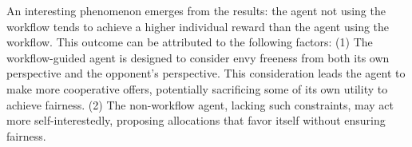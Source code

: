 \begin{table}[!ht]
    \centering
    \caption{Workflow-LLM vs. Raw-LLM}
    \label{tab:workflow-raw}
\end{table}

\begin{table}[!ht]
    \centering
    \caption{Raw-LLM vs. Workflow-LLM}
    \label{tab:raw-workflow}
\end{table}

An interesting phenomenon emerges from the results: the agent not using the workflow tends to achieve a higher individual reward than the agent using the workflow. This outcome can be attributed to the following factors: (1) The workflow-guided agent is designed to consider envy freeness from both its own perspective and the opponent's perspective. This consideration leads the agent to make more cooperative offers, potentially sacrificing some of its own utility to achieve fairness. (2) The non-workflow agent, lacking such constraints, may act more self-interestedly, proposing allocations that favor itself without ensuring fairness.

